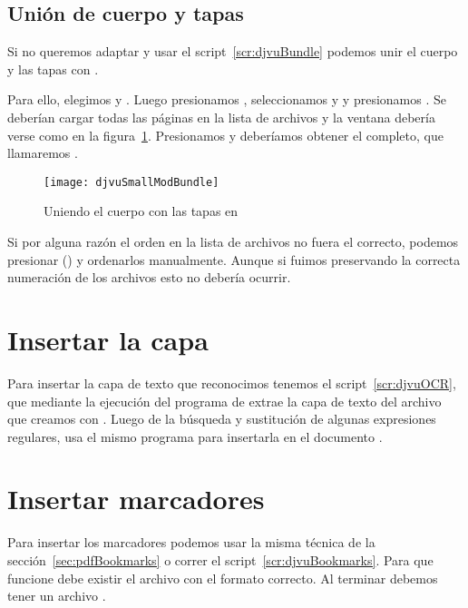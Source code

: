 \documentclass[%
	a5paper,
	10pt,
	twoside,
	openright,
	final,
]{memoir}
\begin{document}
	\subsection{Unión de cuerpo y tapas} Si no queremos adaptar y usar el script~\ref{scr:djvuBundle} podemos unir el cuerpo y las tapas con \djvusmallmod.

	Para ello, elegimos  y . Luego presionamos , seleccionamos  y  y presionamos . Se deberían cargar todas las páginas en la lista de archivos y la ventana debería verse como en la figura~\ref{fig:djvuSmallModBundle}. Presionamos  y deberíamos obtener el \djvu completo, que llamaremos .

	\begin{figure}
		\texttt{[image: djvuSmallModBundle]}
		\caption{Uniendo el cuerpo con las tapas en \djvusmallmod\label{fig:djvuSmallModBundle}}
	\end{figure}

	Si por alguna razón el orden en la lista de archivos no fuera el correcto, podemos presionar  () y ordenarlos manualmente. Aunque si fuimos preservando la correcta numeración de los archivos esto no debería ocurrir.

	\section{Insertar la capa \texorpdfstring{\ocr}{OCR}\label{sec:djvuOCR}} Para insertar la capa de texto que reconocimos tenemos el script~\ref{scr:djvuOCR}, que mediante la ejecución del programa  de \djvulibre extrae la capa de texto del archivo  que creamos con \abby. Luego de la búsqueda y sustitución de algunas expresiones regulares, usa el mismo programa para insertarla en el documento .


	\section{Insertar marcadores\label{sec:djvuBookmarks}} Para insertar los marcadores podemos usar la misma técnica de la sección~\ref{sec:pdfBookmarks} o correr el script~\ref{scr:djvuBookmarks}. Para que funcione debe existir el archivo  con el formato correcto. Al terminar debemos tener un archivo .
\end{document}
